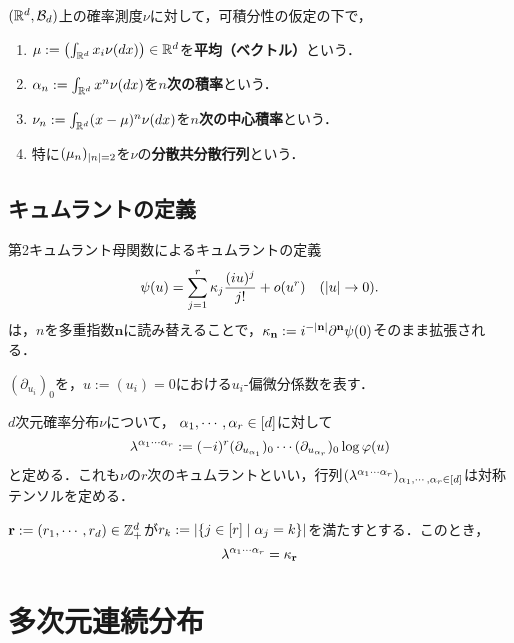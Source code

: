 \documentclass[uplatex,dvipdfmx]{jsreport}
\begin{document}
\begin{definition}
    $(\mathbb{R}^d,\mathcal{B}_d)$上の確率測度$\nu$に対して，可積分性の仮定の下で，
    \begin{enumerate}
        \item $\mu:=\left(\int_{\mathbb{R}^d}x_i\nu(dx)\right)\in\mathbb{R}^d$を\textbf{平均（ベクトル）}という．
        \item $\alpha_n:=\int_{\mathbb{R}^d}x^n\nu(dx)$を\textbf{$n$次の積率}という．
        \item $\nu_n:=\int_{\mathbb{R}^d}(x-\mu)^n\nu(dx)$を\textbf{$n$次の中心積率}という．
        \item 特に$(\mu_n)_{\lvert n\rvert=2}$を$\nu$の\textbf{分散共分散行列}という．
    \end{enumerate}
\end{definition}

\subsection{キュムラントの定義}

\begin{definition}
    第2キュムラント母関数によるキュムラントの定義
    \[\psi(u)=\sum^r_{j=1}\kappa_j\frac{(iu)^j}{j!}+o(u^r)\quad(\lvert u\rvert\to0).\]
    は，$n$を多重指数$\mathbf{n}$に読み替えることで，$\kappa_{\mathbf{n}}:=i^{-\lvert\mathbf{n}\rvert}\partial^{\mathbf{n}}\psi(0)$そのまま拡張される．
\end{definition}

\begin{notation}
    $(\partial_{u_i})_0$を，$u:=(u_i)=0$における$u_i$-偏微分係数を表す．
\end{notation}

\begin{discussion}[キュムラントのテンソル表現]
    $d$次元確率分布$\nu$について，
    $\alpha_1,\cdots,\alpha_r\in[d]$に対して
    \[\lambda^{\alpha_1\cdots\alpha_r}:=(-i)^r(\partial_{u_{\alpha_1}})_0\cdots(\partial_{u_{\alpha_r}})_0\log\varphi(u)\]
    と定める．これも$\nu$の$r$次のキュムラントといい，行列$(\lambda^{\alpha_1\cdots\alpha_r})_{\alpha_1,\cdots,\alpha_r\in[d]}$は対称テンソルを定める．
\end{discussion}
\begin{remarks}
    $\mathbf{r}:=(r_1,\cdots,r_d)\in\mathbb{Z}^d_+$が$r_k:=\left|\left\{j\in[r]\mid\alpha_j=k\right\}\right|$を満たすとする．このとき，
    \[\lambda^{\alpha_1\cdots\alpha_r}=\kappa_{\mathbf{r}}\]
\end{remarks}

\section{多次元連続分布}
\end{document}
